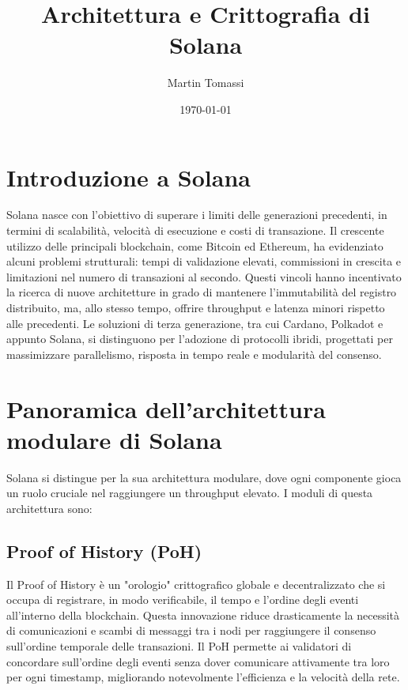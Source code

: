 \documentclass[a4paper,12pt]{report}
\title{Architettura e Crittografia di Solana}
\author{Martin Tomassi}
\date{\today}
\begin{document}
	\maketitle
	\tableofcontents
	
	\chapter{Introduzione a Solana}
	Solana nasce con l’obiettivo di superare i limiti delle generazioni precedenti, in termini di scalabilità, velocità di esecuzione e costi di transazione. Il crescente utilizzo delle principali blockchain, come Bitcoin ed Ethereum, ha evidenziato alcuni problemi strutturali: tempi di validazione elevati, commissioni in crescita e limitazioni nel numero di transazioni al secondo. Questi vincoli hanno incentivato la ricerca di nuove architetture in grado di mantenere l’immutabilità del registro distribuito, ma, allo stesso tempo, offrire throughput e latenza minori rispetto alle precedenti. Le soluzioni di terza generazione, tra cui Cardano, Polkadot e appunto Solana, si distinguono per l’adozione di protocolli ibridi, progettati per massimizzare parallelismo, risposta in tempo reale e modularità del consenso.
	
	\chapter{Panoramica dell'architettura modulare di Solana}
	
	Solana si distingue per la sua architettura modulare, dove ogni componente gioca un ruolo cruciale nel raggiungere un throughput elevato. I moduli di questa architettura sono:
	
	\section{Proof of History (PoH)}
	Il Proof of History è un "orologio" crittografico globale e decentralizzato che si occupa di registrare, in modo verificabile, il tempo e l'ordine degli eventi all'interno della blockchain. Questa innovazione riduce drasticamente la necessità di comunicazioni e scambi di messaggi tra i nodi per raggiungere il consenso sull'ordine temporale delle transazioni. Il PoH permette ai validatori di concordare sull'ordine degli eventi senza dover comunicare attivamente tra loro per ogni timestamp, migliorando notevolmente l'efficienza e la velocità della rete.
	
\end{document}

